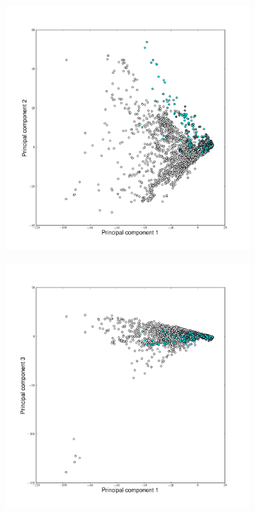 \begin{landscape} 
	\thispagestyle{empty}
	\begin{figure}
	\vspace{-3.5cm}
	\begin{flushleft}
	\hspace{-2cm}
	\begin{subfigure}[t]{0.42\textwidth}
	\includegraphics[width=1\textwidth]{./img/PCAcoor01.png}
	\end{subfigure}
	\begin{subfigure}[t]{0.42\textwidth}
	\includegraphics[width=1\textwidth]{./img/PCAcoor02.png}

\end{subfigure}
\end{flushleft}
\end{figure}
\end{landscape}
